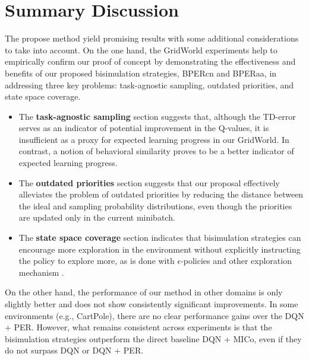\section{Summary Discussion}

The propose method yield promising results with some additional considerations to take into account. On the one hand, the GridWorld experiments help to empirically confirm our proof of concept by demonstrating the effectiveness and benefits of our proposed bisimulation strategies, BPERcn and BPERaa, in addressing three key problems: task-agnostic sampling, outdated priorities, and state space coverage.

\begin{itemize}
    \item The \textbf{task-agnostic sampling} section suggests that, although the TD-error serves as an indicator of potential improvement in the Q-values, it is insufficient as a proxy for expected learning progress in our GridWorld. In contrast, a notion of behavioral similarity proves to be a better indicator of expected learning progress.
    \item The \textbf{outdated priorities} section suggests that our proposal effectively alleviates the problem of outdated priorities by reducing the distance between the ideal and sampling probability distributions, even though the priorities are updated only in the current minibatch.
    \item The \textbf{state space coverage} section indicates that bisimulation strategies can encourage more exploration in the environment without explicitly instructing the policy to explore more, as is done with $\epsilon$-policies and other exploration mechanism \cite{amin2021survey,ladosz2022exploration}.    
\end{itemize}

On the other hand, the performance of our method in other domains is only slightly better and does not show consistently significant improvements. In some environments (e.g., CartPole), there are no clear performance gains over the DQN + PER. However, what remains consistent across experiments is that the bisimulation strategies outperform the direct baseline DQN + MICo, even if they do not surpass DQN or DQN + PER.

